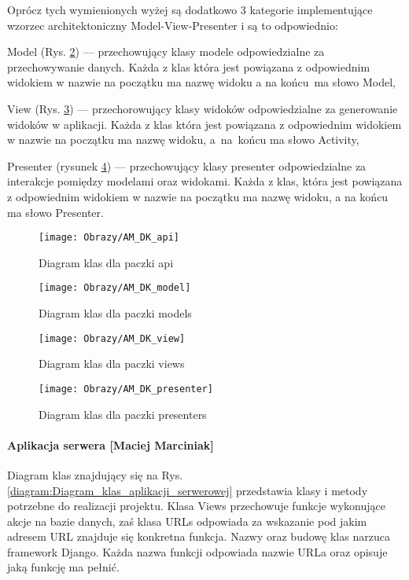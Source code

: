 Oprócz tych wymienionych wyżej są dodatkowo 3 kategorie implementujące wzorzec architektoniczny Model-View-Presenter i są to odpowiednio:
\begin{itemize*}
	\item Model (Rys. \ref{Diagram klas dla paczki models}) 
	--- przechowujący klasy modele odpowiedzialne za przechowywanie danych. Każda z klas która jest powiązana z odpowiednim widokiem   w nazwie na początku ma nazwę widoku a na końcu~ma słowo Model,   
	\item View 
	(Rys. \ref{Diagram klas dla paczki views}) 
	--- przechorowujący klasy widoków odpowiedzialne za generowanie widoków w aplikacji. Każda z klas która jest powiązana z odpowiednim widokiem   w nazwie na początku ma nazwę widoku, a~na~końcu ma słowo Activity, 
	\item Presenter
	(rysunek \ref{Diagram klas dla paczki presenters}) 
	--- przechowujący klasy presenter odpowiedzialne za interakcje pomiędzy modelami oraz widokami. Każda z klas, która jest powiązana z odpowiednim widokiem w nazwie na początku ma nazwę widoku, a na końcu ma słowo Presenter\cite{And}.
\end{itemize*}
\newpage
\begin{figure}[ht!]
	\centering
	\texttt{[image: Obrazy/AM\_DK\_api]}
	\caption{Diagram klas dla paczki api}
	\label{Diagram klas dla paczki api}
\end{figure}
\newpage

\newpage
\begin{figure}[ht!]
	\centering
	\texttt{[image: Obrazy/AM\_DK\_model]}
	\caption{Diagram klas dla paczki models}
	\label{Diagram klas dla paczki models}
\end{figure}

\newpage
\begin{figure}[ht!]
	\centering
	\texttt{[image: Obrazy/AM\_DK\_view]}
	\caption{Diagram klas dla paczki views}
	\label{Diagram klas dla paczki views}
\end{figure}
\newpage

\begin{figure}[ht!]
	\centering
	\texttt{[image: Obrazy/AM\_DK\_presenter]}
	\caption{Diagram klas dla paczki presenters}
	\label{Diagram klas dla paczki presenters}
\end{figure}
\newpage		

\paragraph*{Aplikacja serwera [Maciej Marciniak]}
Diagram klas znajdujący się na Rys. \ref{diagram:Diagram_klas_aplikacji_serwerowej} przedstawia klasy i metody potrzebne do realizacji projektu. Klasa Views przechowuje funkcje wykonujące akcje na bazie danych, zaś klasa URLs odpowiada za wskazanie pod jakim adresem URL znajduje się konkretna funkcja. Nazwy oraz budowę klas narzuca framework Django. Każda nazwa funkcji odpowiada nazwie URLa oraz opisuje jaką funkcję ma pełnić.

